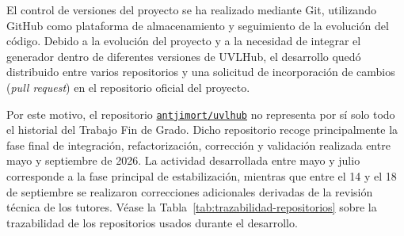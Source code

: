 El control de versiones del proyecto se ha realizado mediante Git, utilizando
GitHub como plataforma de almacenamiento y seguimiento de la evolución del
código. Debido a la evolución del proyecto y a la necesidad de integrar el
generador dentro de diferentes versiones de UVLHub, el desarrollo quedó
distribuido entre varios repositorios y una solicitud de incorporación de
cambios (\textit{pull request}) en el repositorio oficial del proyecto.

Por este motivo, el repositorio
\href{https://github.com/antjimort/uvlhub}{\texttt{antjimort/uvlhub}}
no representa por sí solo todo el historial del Trabajo Fin de Grado. Dicho repositorio recoge principalmente la fase final de integración,
refactorización, corrección y validación realizada entre mayo y septiembre de
2026. La actividad desarrollada entre mayo y julio corresponde a la fase
principal de estabilización, mientras que entre el 14 y el 18 de septiembre se
realizaron correcciones adicionales derivadas de la revisión técnica de los tutores. Véase la Tabla~\ref{tab:trazabilidad-repositorios} sobre la trazabilidad de los repositorios usados durante el desarrollo.

